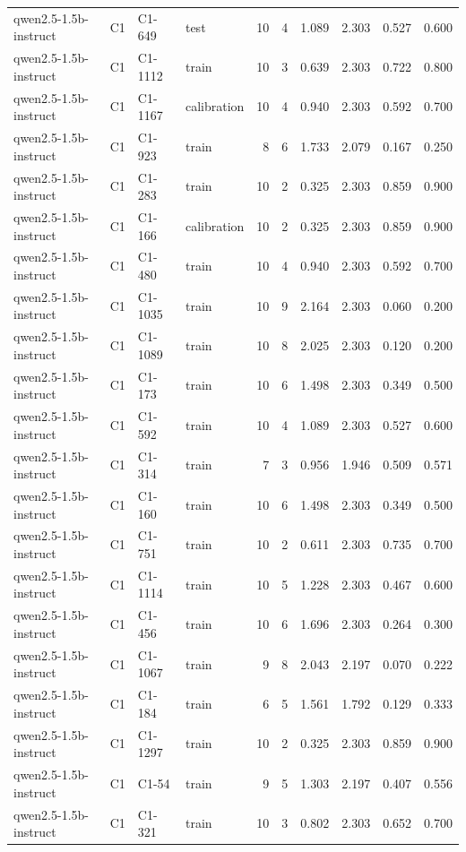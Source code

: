 \begin{table}
\begin{tabular}{llllrrrrrr}
qwen2.5-1.5b-instruct & C1 & C1-649 & test & 10 & 4 & 1.089 & 2.303 & 0.527 & 0.600 \\
qwen2.5-1.5b-instruct & C1 & C1-1112 & train & 10 & 3 & 0.639 & 2.303 & 0.722 & 0.800 \\
qwen2.5-1.5b-instruct & C1 & C1-1167 & calibration & 10 & 4 & 0.940 & 2.303 & 0.592 & 0.700 \\
qwen2.5-1.5b-instruct & C1 & C1-923 & train & 8 & 6 & 1.733 & 2.079 & 0.167 & 0.250 \\
qwen2.5-1.5b-instruct & C1 & C1-283 & train & 10 & 2 & 0.325 & 2.303 & 0.859 & 0.900 \\
qwen2.5-1.5b-instruct & C1 & C1-166 & calibration & 10 & 2 & 0.325 & 2.303 & 0.859 & 0.900 \\
qwen2.5-1.5b-instruct & C1 & C1-480 & train & 10 & 4 & 0.940 & 2.303 & 0.592 & 0.700 \\
qwen2.5-1.5b-instruct & C1 & C1-1035 & train & 10 & 9 & 2.164 & 2.303 & 0.060 & 0.200 \\
qwen2.5-1.5b-instruct & C1 & C1-1089 & train & 10 & 8 & 2.025 & 2.303 & 0.120 & 0.200 \\
qwen2.5-1.5b-instruct & C1 & C1-173 & train & 10 & 6 & 1.498 & 2.303 & 0.349 & 0.500 \\
qwen2.5-1.5b-instruct & C1 & C1-592 & train & 10 & 4 & 1.089 & 2.303 & 0.527 & 0.600 \\
qwen2.5-1.5b-instruct & C1 & C1-314 & train & 7 & 3 & 0.956 & 1.946 & 0.509 & 0.571 \\
qwen2.5-1.5b-instruct & C1 & C1-160 & train & 10 & 6 & 1.498 & 2.303 & 0.349 & 0.500 \\
qwen2.5-1.5b-instruct & C1 & C1-751 & train & 10 & 2 & 0.611 & 2.303 & 0.735 & 0.700 \\
qwen2.5-1.5b-instruct & C1 & C1-1114 & train & 10 & 5 & 1.228 & 2.303 & 0.467 & 0.600 \\
qwen2.5-1.5b-instruct & C1 & C1-456 & train & 10 & 6 & 1.696 & 2.303 & 0.264 & 0.300 \\
qwen2.5-1.5b-instruct & C1 & C1-1067 & train & 9 & 8 & 2.043 & 2.197 & 0.070 & 0.222 \\
qwen2.5-1.5b-instruct & C1 & C1-184 & train & 6 & 5 & 1.561 & 1.792 & 0.129 & 0.333 \\
qwen2.5-1.5b-instruct & C1 & C1-1297 & train & 10 & 2 & 0.325 & 2.303 & 0.859 & 0.900 \\
qwen2.5-1.5b-instruct & C1 & C1-54 & train & 9 & 5 & 1.303 & 2.197 & 0.407 & 0.556 \\
qwen2.5-1.5b-instruct & C1 & C1-321 & train & 10 & 3 & 0.802 & 2.303 & 0.652 & 0.700 \\

\end{tabular}
\end{table}
